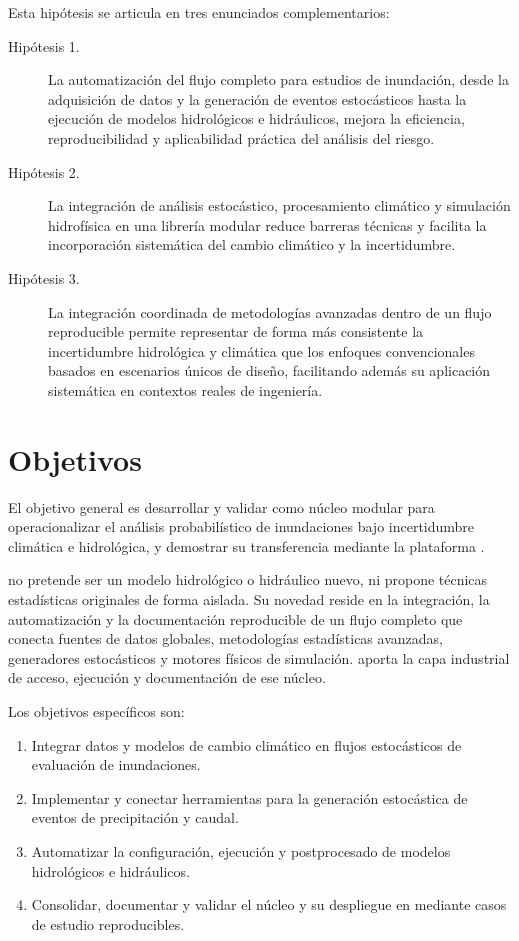Esta hipótesis se articula en tres enunciados complementarios:

\begin{description}
  \item[Hipótesis 1.] La automatización del flujo completo para estudios de inundación, desde la adquisición de datos y la generación de eventos estocásticos hasta la ejecución de modelos hidrológicos e hidráulicos, mejora la eficiencia, reproducibilidad y aplicabilidad práctica del análisis del riesgo.
  \item[Hipótesis 2.] La integración de análisis estocástico, procesamiento climático y simulación hidrofísica en una librería modular reduce barreras técnicas y facilita la incorporación sistemática del cambio climático y la incertidumbre.
  \item[Hipótesis 3.] La integración coordinada de metodologías avanzadas dentro de un flujo reproducible permite representar de forma más consistente la incertidumbre hidrológica y climática que los enfoques convencionales basados en escenarios únicos de diseño, facilitando además su aplicación sistemática en contextos reales de ingeniería.
\end{description}

\section{Objetivos}

El objetivo general es desarrollar y validar \pyhydra como núcleo modular para operacionalizar el análisis probabilístico de inundaciones bajo incertidumbre climática e hidrológica, y demostrar su transferencia mediante la plataforma \hydra.

\pyhydra no pretende ser un modelo hidrológico o hidráulico nuevo, ni propone técnicas estadísticas originales de forma aislada. Su novedad reside en la integración, la automatización y la documentación reproducible de un flujo completo que conecta fuentes de datos globales, metodologías estadísticas avanzadas, generadores estocásticos y motores físicos de simulación. \hydra aporta la capa industrial de acceso, ejecución y documentación de ese núcleo.

Los objetivos específicos son:

\begin{enumerate}
  \item Integrar datos y modelos de cambio climático en flujos estocásticos de evaluación de inundaciones.
  \item Implementar y conectar herramientas para la generación estocástica de eventos de precipitación y caudal.
  \item Automatizar la configuración, ejecución y postprocesado de modelos hidrológicos e hidráulicos.
  \item Consolidar, documentar y validar el núcleo \pyhydra y su despliegue en \hydra mediante casos de estudio reproducibles.
\end{enumerate}

